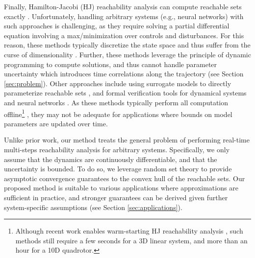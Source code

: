 \documentclass{article}
\begin{document}
Finally, Hamilton-Jacobi (HJ) reachability analysis can compute reachable sets exactly \citep{HJIoverviewBansal2017,FisacRSS2018}. Unfortunately, handling arbitrary systems %
(e.g., neural networks) 
with such approaches is challenging, as they require  
solving a partial differential equation involving a max/minimization over controls and disturbances. For this reason, these methods typically discretize the state space and thus suffer from the curse of dimensionality \citep{HJIoverviewBansal2017}. Further, these methods leverage the principle of dynamic programming to compute solutions, and thus %
cannot handle parameter uncertainty which introduces time correlations along the trajectory (see Section \ref{sec:problem}). 
%
Other approaches include using surrogate models to directly parameterize reachable sets \citep{RubiesICRA2019,fan2020deep},  %
and formal verification tools for dynamical systems \citep{ChenFlowstar2012} and neural networks \citep{IvanovVerisig2019}. 
As these methods typically perform all computation offline\footnote{%
Although recent work enables warm-starting HJ reachability analysis \citep{warmStartingHJI_Herbert2019}, such methods still require a few seconds for a 3D linear system, and more than an hour for a 10D quadrotor.}%
, they may not be adequate for applications %
where bounds on model parameters are updated over time.


Unlike prior work, our method treats the general problem of performing real-time multi-steps reachability analysis for arbitrary systems. %
Specifically, we only assume that the dynamics are continuously differentiable, and that the uncertainty is bounded. 
To do so, we leverage random set theory to provide asymptotic convergence guarantees to the convex hull of the reachable sets. 
Our proposed method is suitable to various applications where approximations are sufficient in practice, and stronger guarantees can be derived given further system-specific assumptions (see Section \ref{sec:applications}). 
\end{document}
